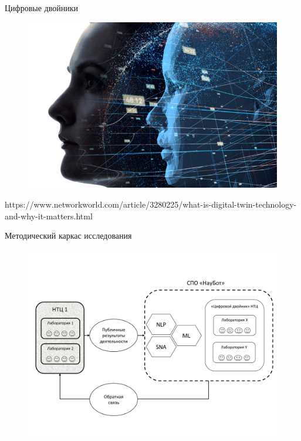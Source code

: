 \documentclass{beamer}
\begin{document}
\begin{frame}{Цифровые двойники}
	\begin{figure}
		\includegraphics[width=\textwidth]{media/digital-twins_woman-in-profile_ai_mirror_duplicate_duo_pair-100760562-large.jpg}
	\end{figure}
	
	\tiny https://www.networkworld.com/article/3280225/what-is-digital-twin-technology-and-why-it-matters.html 
	
\end{frame}


\begin{frame}{Методический каркас исследования}
	\begin{figure}
		\includegraphics[width=\textwidth]{media/bim2.png}
	\end{figure}
	
\end{frame}
\end{document}
